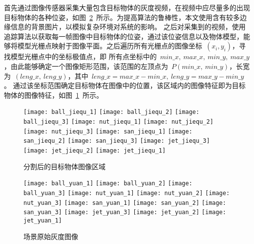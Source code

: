 首先通过图像传感器采集大量包含目标物体的灰度视频，在视频中应尽量多的出现目标物体的各种位姿，如图~\ref{fig:chap03:raw_gray_imgs}~所示。为提高算法的鲁棒性，本文使用含有较多边缘信息的背景图片，以模拟复杂环境对系统的影响。
之后对采集到的视频，使用追踪算法以获取每一帧图像中目标物体的位姿，通过该位姿信息以及物体模型，能够将模型光栅点映射于图像平面。之后遍历所有光栅点的图像坐标~$(x_i,y_i)$，寻找模型光栅点中的坐标极值点，即
所有点坐标中的~$min\_x,~max\_x,~min\_y,~max\_y$，由此能够确定一个图像矩形范围，该范围的左顶点为~$P(min\_x,~min\_y)$，长宽为~$(leng\_x,~leng\_y)$，其中~$leng\_x=max\_x-min\_x,~leng\_y=max\_y-min\_y$。
通过该坐标范围确定目标物体在图像中的位置，该区域内的图像特征即为目标物体的图像特征，如图~\ref{fig:chap03:area_interesting}~所示。

\begin{figure}[b] %
  \centering%
    \texttt{[image: ball\_jiequ\_1]}\hspace{0.5em}
    \texttt{[image: ball\_jiequ\_2]}\hspace{0.5em}
    \texttt{[image: ball\_jiequ\_3]}\hspace{0.5em}
    \texttt{[image: nut\_jiequ\_1]}\hspace{0.5em}
    \texttt{[image: nut\_jiequ\_2]}\hspace{0.5em}
    \texttt{[image: nut\_jiequ\_3]}
    \vskip 1pt
    \texttt{[image: san\_jiequ\_1]}\hspace{1em}
    \texttt{[image: san\_jiequ\_2]}\hspace{1em}
    \texttt{[image: san\_jiequ\_3]}\hspace{1em}
    \texttt{[image: jet\_jiequ\_3]}\hspace{1em}
    \texttt{[image: jet\_jiequ\_2]}\hspace{1em}
    \vskip 1pt
    \texttt{[image: jet\_jiequ\_1]}
  \caption{分割后的目标物体图像区域}
  \label{fig:chap03:area_interesting}
  \end{figure}

\begin{figure}[t] %
  \centering%
    \texttt{[image: ball\_yuan\_1]}
    \texttt{[image: ball\_yuan\_2]}
    \texttt{[image: ball\_yuan\_3]}
    \vskip 1pt
    \texttt{[image: nut\_yuan\_1]}
    \texttt{[image: nut\_yuan\_2]}
    \texttt{[image: nut\_yuan\_3]}
    \vskip 1pt
    \texttt{[image: san\_yuan\_1]}
    \texttt{[image: san\_yuan\_2]}
    \texttt{[image: san\_yuan\_3]}
    \vskip 1pt
    \texttt{[image: jet\_yuan\_3]}
    \texttt{[image: jet\_yuan\_2]}
    \texttt{[image: jet\_yuan\_1]}
    \caption{场景原始灰度图像}
    \label{fig:chap03:raw_gray_imgs}
    \end{figure}

